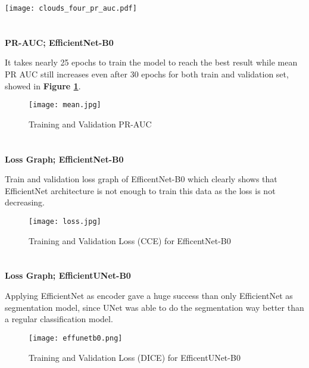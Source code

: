 \documentclass[conference]{IEEEtran}
\begin{document}
\begin{figure*}[h!]
 \center
  \texttt{[image: clouds\_four\_pr\_auc.pdf]}
  \caption{PR-Curves for All Four Classes}
  \label{AAA}
\end{figure*}

\newpage




\section{}{\textbf{PR-AUC; EfficientNet-B0}}

It takes nearly 25 epochs to train the model to reach the best result while mean PR AUC still increases even after 30 epochs for both train and validation set, showed in \textbf{Figure \ref{mean}}.

\begin{figure}[ht!]
    \centering
    \texttt{[image: mean.jpg]}
    \caption{Training and Validation PR-AUC}
    \label{mean}
\end{figure}




\section{}{\textbf{Loss Graph; EfficientNet-B0}}

Train and validation loss graph of EfficentNet-B0 which clearly shows that EfficientNet architecture is not enough to train this data as the loss is not decreasing.

\begin{figure}[ht!]
    \centering
    \texttt{[image: loss.jpg]}
    \caption{Training and Validation Loss (CCE) for EfficentNet-B0}
    \label{loss}
\end{figure}

\newpage
\section{}{\textbf{Loss Graph; EfficientUNet-B0}}

Applying EfficientNet as encoder gave a huge success than only EfficientNet as segmentation model, since UNet was able to do the segmentation way better than a regular classification model.  

\begin{figure}[ht!]
    \centering
    \texttt{[image: effunetb0.png]}
    \caption{Training and Validation Loss (DICE) for EfficentUNet-B0}
\end{figure}
\end{document}
